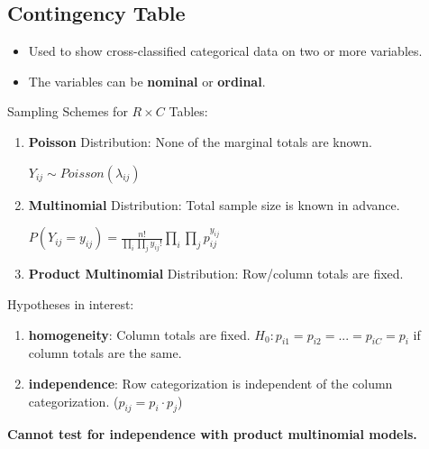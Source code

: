 \documentclass[10pt,landscape, fleqn]{article}
\begin{document}
\begin{multicols}{3}
		\section{Contingency Table}
			\begin{itemize}
				\item Used to show cross-classified categorical data on two or more variables.
				\item The variables can be \textbf{nominal} or \textbf{ordinal}.
			\end{itemize}
			Sampling Schemes for $R \times C$ Tables:
			\begin{enumerate}
				\item \textbf{Poisson} Distribution: None of the marginal totals are known. \par
							 $Y_{ij} \sim Poisson(\lambda_{ij})$
				\item \textbf{Multinomial} Distribution: Total sample size is known in advance. \par 
							 $P(Y_{ij}=y_{ij}) = \frac{n!}{\prod_{i}\prod_{j}y_{ij}!}\prod_{i}\prod_{j}p_{ij}^{y_{ij}} $
				\item \textbf{Product Multinomial} Distribution: Row/column totals are fixed.
			\end{enumerate}
			Hypotheses in interest:
			\begin{enumerate}
				\item \textbf{homogeneity}: Column totals are fixed. $H_0: p_{i1}=p_{i2}=...=p_{iC}=p_i$ if column totals are the same.
				\item \textbf{independence}: Row categorization is independent of the column categorization. ($p_{ij}=p_i \cdot p_j$)
			\end{enumerate}
			\textbf{Cannot test for independence with product multinomial models.}

\end{multicols}
\end{document}
